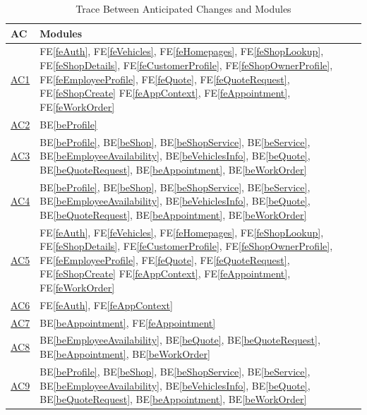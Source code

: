 \documentclass[12pt, titlepage]{article}
\newcommand{\feref}[1]{FE\ref{#1}}
\newcommand{\beref}[1]{BE\ref{#1}}
\begin{document}
\begin{table}[H]
\centering
\begin{tabular}{p{} p{}}
\toprule
\textbf{AC} & \textbf{Modules}\\
\midrule
\hyperref[acDevice]{AC1} & \feref{feAuth}, \feref{feVehicles}, \feref{feHomepages}, \feref{feShopLookup}, \feref{feShopDetails}, \feref{feCustomerProfile}, \feref{feShopOwnerProfile}, \feref{feEmployeeProfile}, \feref{feQuote}, \feref{feQuoteRequest}, \feref{feShopCreate} \feref{feAppContext}, \feref{feAppointment}, \feref{feWorkOrder}\\
\hyperref[acUsers]{AC2} & \beref{beProfile} \\
\hyperref[acStorage]{AC3} & \beref{beProfile}, \beref{beShop}, \beref{beShopService}, \beref{beService}, \beref{beEmployeeAvailability}, \beref{beVehiclesInfo}, \beref{beQuote}, \beref{beQuoteRequest}, \beref{beAppointment}, \beref{beWorkOrder}\\
\hyperref[acBandwidth]{AC4} & \beref{beProfile}, \beref{beShop}, \beref{beShopService}, \beref{beService}, \beref{beEmployeeAvailability}, \beref{beVehiclesInfo}, \beref{beQuote}, \beref{beQuoteRequest}, \beref{beAppointment}, \beref{beWorkOrder}\\
\hyperref[acGUI]{AC5} & \feref{feAuth}, \feref{feVehicles}, \feref{feHomepages}, \feref{feShopLookup}, \feref{feShopDetails}, \feref{feCustomerProfile}, \feref{feShopOwnerProfile}, \feref{feEmployeeProfile}, \feref{feQuote}, \feref{feQuoteRequest}, \feref{feShopCreate} \feref{feAppContext}, \feref{feAppointment}, \feref{feWorkOrder}\\
\hyperref[acAuth]{AC6} & \feref{feAuth}, \feref{feAppContext} \\
\hyperref[acScheduling]{AC7} & \beref{beAppointment}, \feref{feAppointment} \\
\hyperref[acNotification]{AC8} & \beref{beEmployeeAvailability}, \beref{beQuote}, \beref{beQuoteRequest}, \beref{beAppointment}, \beref{beWorkOrder} \\
\hyperref[acHardware]{AC9} & \beref{beProfile}, \beref{beShop}, \beref{beShopService}, \beref{beService}, \beref{beEmployeeAvailability}, \beref{beVehiclesInfo}, \beref{beQuote}, \beref{beQuoteRequest}, \beref{beAppointment}, \beref{beWorkOrder}\\
\bottomrule
\end{tabular}
\caption{Trace Between Anticipated Changes and Modules}
\label{TblACT}
\end{table}
\end{document}

